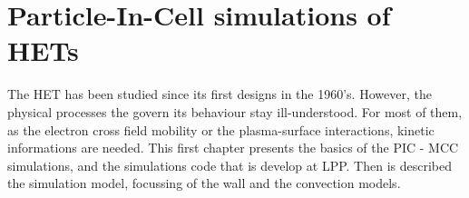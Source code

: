 
\chapter{Particle-In-Cell simulations of HETs}
\label{ch-1}

% 
% 
% 

The \ac{HET} has been studied since its first designs in the 1960's.
However, the physical processes the govern its behaviour stay ill-understood.
For most of them, as the electron cross field mobility or the plasma-surface interactions, kinetic informations are needed.
This first chapter presents the basics of the \ac{PIC} - \ac{MCC} simulations, and the simulations code \LPPic that is develop at \ac{LPP}.
Then is described the simulation model, focussing of the wall and the convection models.

\minitoc


 









